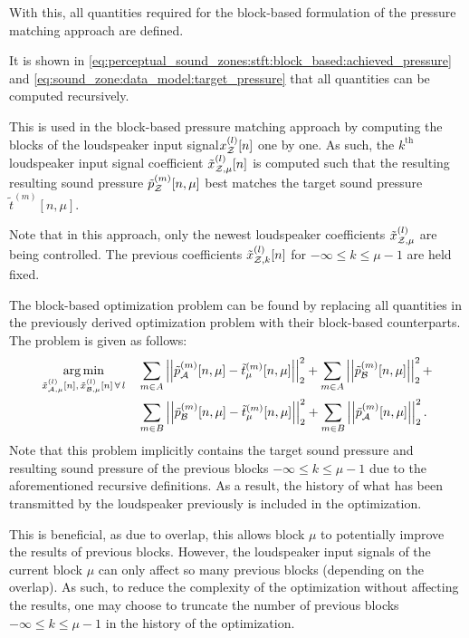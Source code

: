 With this, all quantities required for the block-based formulation of the pressure matching approach are defined.

It is shown in \autoref{eq:perceptual_sound_zones:stft:block_based:achieved_pressure} and \autoref{eq:sound_zone:data_model:target_pressure} that all quantities can be computed recursively.

This is used in the block-based pressure matching approach by computing the blocks of the loudspeaker input signal$x_{\mathcal{Z}}^{(l)}[n]$ one by one. 
As such, the $k^\text{th}$ loudspeaker input signal coefficient $\tilde{x}^{(l)}_{\mathcal{Z},\mu}[n]$ is computed such that the resulting resulting sound pressure $\tilde{p}_{\mathcal{Z}}^{(m)}[n, \mu]$ best matches the target sound pressure $\tilde{t}^{(m)}[n, \mu]$. 

Note that in this approach, only the newest loudspeaker coefficients $\tilde{x}^{(l)}_{\mathcal{Z},\mu}$ are being controlled. 
The previous coefficients $\tilde{x}^{(l)}_{\mathcal{Z},k}[n]$ for $-\infty \leq k \leq \mu - 1$ are held fixed.

The block-based optimization problem can be found by replacing all quantities in the previously derived optimization problem with their block-based counterparts.
The problem is given as follows:
\begin{align}
    \begin{aligned}
        \argmin{\tilde{x}_{\za,\mu}^{(l)}[n],\,\tilde{x}_{\zb,\mu}^{(l)}[n]\,\forall\,l}{
           &\sum_{m\in A} \norm[2][2]{\tilde{p}_{\za}^{(m)}[n,\mu] - \tilde{t}_\mu^{(m)}[n,\mu]} +
           \sum_{m\in A} \norm[2][2]{\tilde{p}_{\zb}^{(m)}[n,\mu]} + \\
           &\sum_{m\in B} \norm[2][2]{\tilde{p}_{\zb}^{(m)}[n,\mu] - \tilde{t}_\mu^{(m)}[n,\mu]} + 
           \sum_{m\in B} \norm[2][2]{\tilde{p}_{\za}^{(m)}[n,\mu]}
        }.
    \end{aligned}
\end{align}
Note that this problem implicitly contains the target sound pressure and resulting sound pressure of the previous blocks $-\infty \leq k \leq \mu - 1$ due to the aforementioned recursive definitions.
As a result, the history of what has been transmitted by the loudspeaker previously is included in the optimization.

This is beneficial, as due to overlap, this allows block $\mu$ to potentially improve the results of previous blocks.
However, the loudspeaker input signals of the current block $\mu$ can only affect so many previous blocks (depending on the overlap).
As such, to reduce the complexity of the optimization without affecting the results, one may choose to truncate the number of previous blocks $-\infty \leq k \leq \mu - 1$ in the history of the optimization.

